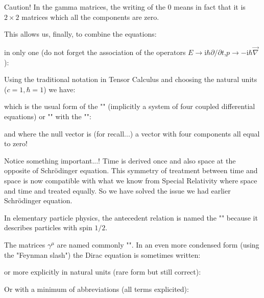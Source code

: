 	\begin{tcolorbox}[colback=red!5,borderline={1mm}{2mm}{red!5},arc=0mm,boxrule=0pt]
	\bcbombe Caution! In the gamma matrices, the writing of the $0$ means in fact that it is $2\times 2$ matrices  which all the components are zero.
	\end{tcolorbox}
	
	This allows us, finally, to combine the equations:
	
	in only one (do not forget the association of the operators $E\rightarrow \mathrm{i}\hbar\partial/\partial t$,$p\rightarrow -\mathrm{i}\hbar\vec{\nabla}$):
	
	Using the traditional notation in Tensor Calculus and choosing the natural units ($c=1,\hbar=1$) we have:
	
	which is the usual form of the "\label{dirac equation}" (implicitly a system of four coupled differential equations) or "" with the "":
	
	and where the null vector is (for recall...) a vector with four components all equal to zero!
	
	Notice something important...! Time is derived once and also space at the opposite of Schrödinger equation. This symmetry of treatment between time and space is now compatible with what we know from Special Relativity where space and time and treated equally. So we have solved the issue we had earlier Schrödinger equation.
	\begin{tcolorbox}[title=Remark,colframe=black,arc=10pt]
	In elementary particle physics, the antecedent relation is named the "" because it describes particles with spin $1/2$.
	\end{tcolorbox}
	The matrices $\gamma^\mu$ are named commonly "". In an even more condensed form (using the "Feynman slash") the Dirac equation is sometimes written:
	
	or more explicitly in natural units (rare form but still correct):
	
	Or with a minimum of abbreviations (all terms explicited):
	
